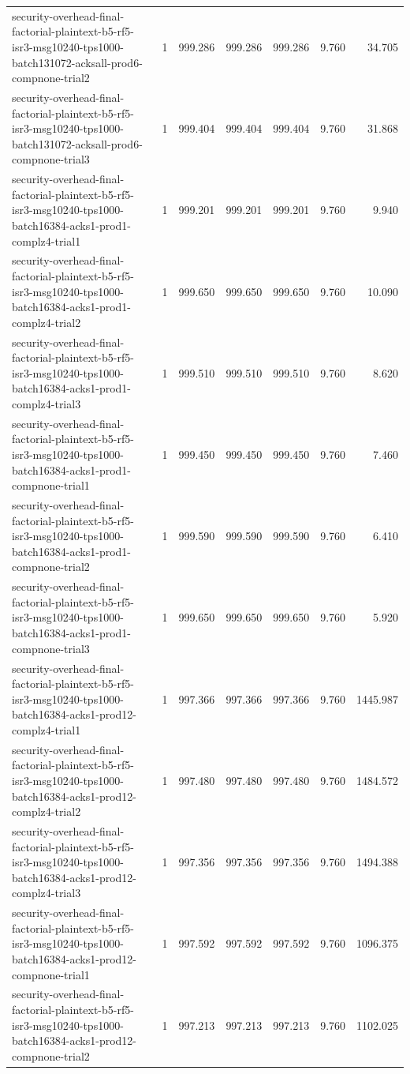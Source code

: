 \begin{tabular}{lrrrrrr}
security-overhead-final-factorial-plaintext-b5-rf5-isr3-msg10240-tps1000-batch131072-acksall-prod6-compnone-trial2 & 1 & 999.286 & 999.286 & 999.286 & 9.760 & 34.705 \\
security-overhead-final-factorial-plaintext-b5-rf5-isr3-msg10240-tps1000-batch131072-acksall-prod6-compnone-trial3 & 1 & 999.404 & 999.404 & 999.404 & 9.760 & 31.868 \\
security-overhead-final-factorial-plaintext-b5-rf5-isr3-msg10240-tps1000-batch16384-acks1-prod1-complz4-trial1 & 1 & 999.201 & 999.201 & 999.201 & 9.760 & 9.940 \\
security-overhead-final-factorial-plaintext-b5-rf5-isr3-msg10240-tps1000-batch16384-acks1-prod1-complz4-trial2 & 1 & 999.650 & 999.650 & 999.650 & 9.760 & 10.090 \\
security-overhead-final-factorial-plaintext-b5-rf5-isr3-msg10240-tps1000-batch16384-acks1-prod1-complz4-trial3 & 1 & 999.510 & 999.510 & 999.510 & 9.760 & 8.620 \\
security-overhead-final-factorial-plaintext-b5-rf5-isr3-msg10240-tps1000-batch16384-acks1-prod1-compnone-trial1 & 1 & 999.450 & 999.450 & 999.450 & 9.760 & 7.460 \\
security-overhead-final-factorial-plaintext-b5-rf5-isr3-msg10240-tps1000-batch16384-acks1-prod1-compnone-trial2 & 1 & 999.590 & 999.590 & 999.590 & 9.760 & 6.410 \\
security-overhead-final-factorial-plaintext-b5-rf5-isr3-msg10240-tps1000-batch16384-acks1-prod1-compnone-trial3 & 1 & 999.650 & 999.650 & 999.650 & 9.760 & 5.920 \\
security-overhead-final-factorial-plaintext-b5-rf5-isr3-msg10240-tps1000-batch16384-acks1-prod12-complz4-trial1 & 1 & 997.366 & 997.366 & 997.366 & 9.760 & 1445.987 \\
security-overhead-final-factorial-plaintext-b5-rf5-isr3-msg10240-tps1000-batch16384-acks1-prod12-complz4-trial2 & 1 & 997.480 & 997.480 & 997.480 & 9.760 & 1484.572 \\
security-overhead-final-factorial-plaintext-b5-rf5-isr3-msg10240-tps1000-batch16384-acks1-prod12-complz4-trial3 & 1 & 997.356 & 997.356 & 997.356 & 9.760 & 1494.388 \\
security-overhead-final-factorial-plaintext-b5-rf5-isr3-msg10240-tps1000-batch16384-acks1-prod12-compnone-trial1 & 1 & 997.592 & 997.592 & 997.592 & 9.760 & 1096.375 \\
security-overhead-final-factorial-plaintext-b5-rf5-isr3-msg10240-tps1000-batch16384-acks1-prod12-compnone-trial2 & 1 & 997.213 & 997.213 & 997.213 & 9.760 & 1102.025 \\

\end{tabular}
